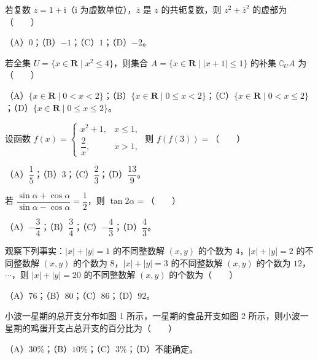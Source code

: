 

\begin{question}
若复数 $z=1+\mathrm i$（$\mathrm i$ 为虚数单位），$\overline z$ 是 $z$ 的共轭复数，则 $z^2+\overline z^2$ 的虚部为\mbox{（　　）}

（A）$0$；（B）$-1$；（C）$1$；（D）$-2$。

\end{question}
\begin{question}
若全集 $U=\{x\in\mathbf R\mid x^2\leqslant4\}$，则集合 $A=\{x\in\mathbf R\mid|x+1|\leqslant1\}$ 的补集 $\complement_UA$ 为\mbox{（　　）}

（A）$\{x\in\mathbf R\mid0<x<2\}$；（B）$\{x\in\mathbf R\mid0\leqslant x<2\}$；（C）$\{x\in\mathbf R\mid0<x\leqslant2\}$；（D）$\{x\in\mathbf R\mid0\leqslant x\leqslant2\}$。

\end{question}
\begin{question}
设函数 $f(x)=\begin{cases}x^2+1,&x\leqslant1,\\\dfrac2x,&x>1,\end{cases}$ 则 $f(f(3))=$\mbox{（　　）}

（A）$\dfrac15$；（B）$3$；（C）$\dfrac23$；（D）$\dfrac{13}9$。

\end{question}
\begin{question}
若 $\dfrac{\sin\alpha+\cos\alpha}{\sin\alpha-\cos\alpha}=\dfrac12$，则 $\tan2\alpha=$\mbox{（　　）}

（A）$-\dfrac34$；（B）$\dfrac34$；（C）$-\dfrac43$；（D）$\dfrac43$。

\end{question}
\begin{question}
观察下列事实：$|x|+|y|=1$ 的不同整数解 $(x,y)$ 的个数为 $4$，$|x|+|y|=2$ 的不同整数解 $(x,y)$ 的个数为 $8$，$|x|+|y|=3$ 的不同整数解 $(x,y)$ 的个数为 $12$，$\cdots$，则 $|x|+|y|=20$ 的不同整数解 $(x,y)$ 的个数为\mbox{（　　）}

（A）$76$；（B）$80$；（C）$86$；（D）$92$。

\Needspace{0.4\textheight}
\end{question}
\begin{question}
小波一星期的总开支分布如图 1 所示，一星期的食品开支如图 2 所示，则小波一星期的鸡蛋开支占总开支的百分比为\mbox{（　　）}
\nopagebreak[4]
\begin{center}\end{center}
\nopagebreak[4]
（A）$30\%$；（B）$10\%$；（C）$3\%$；（D）不能确定。

\Needspace{0.4\textheight}
\end{question}
